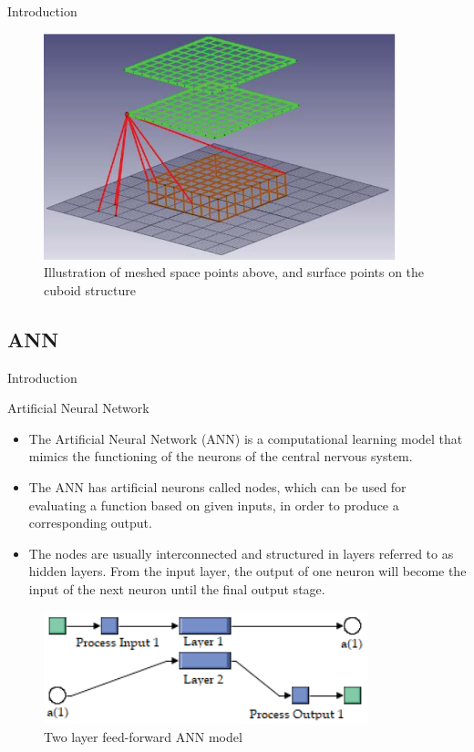 \documentclass{beamer}
\begin{document}
\begin{frame}{Introduction}
    \begin{figure}
        \centering
        \includegraphics[width=0.7\columnwidth]{Figures/DEGM_concept.png}
        \caption{\centering Illustration of meshed space points above, and surface points on the cuboid structure}
        \label{DEGM_concept}
    \end{figure}
\end{frame}

\subsection{ANN}
\begin{frame}{Introduction}
    \vspace{-2mm}
    \begin{block}{Artificial Neural Network}
    \begin{itemize}
    \justifying
        \item The Artificial Neural Network (ANN) is a computational learning model that mimics the functioning of the neurons of the central nervous system.
        \item The ANN has artificial neurons called nodes, which can be used for evaluating a function based on given inputs, in order to produce a corresponding output.
        \item The nodes are usually interconnected and structured in layers referred to as hidden layers. From the input layer, the output of one neuron will become the input of the next neuron until the final output stage.
    \end{itemize}\vspace{-3mm}
    \begin{figure}
        \centering
        \includegraphics[width=0.5\columnwidth]{Figures/ANN-layers.png}
        \caption{Two layer feed-forward ANN model}
        \label{ANN-layers}
    \end{figure}\vspace{-6mm}
    \end{block}
\end{frame}
\end{document}
